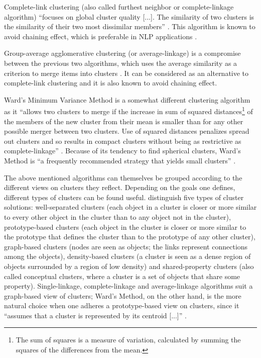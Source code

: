 Complete-link clustering (also called furthest neighbor or complete-linkage algorithm) “focuses on global cluster quality [...]. The similarity of two clusters is the similarity of their two most dissimilar members” \citep[505]{manning_foundations_1999}. This algorithm is known to avoid chaining effect, which is preferable in NLP applications \citep[506]{manning_foundations_1999}.

Group-average agglomerative clustering (or average-linkage) is a compromise between the previous two algorithms, which uses the average similarity as a criterion to merge items into clusters \citep[507]{manning_foundations_1999}. It can be considered as an alternative to complete-link clustering and it is also known to avoid chaining effect.

Ward’s Minimum Variance Method is a somewhat different clustering algorithm as it “allows two clusters to merge if the increase in sum of squared distances\footnote{The sum of squares is a measure of variation, calculated by summing the squares of the differences from the mean.} of the members of the new cluster from their mean is smaller than for any other possible merger between two clusters. Use of squared distances penalizes spread out clusters and so results in compact clusters without being as restrictive as complete-linkage” \citep[426]{glynn_cluster_2014}. Because of its tendency to find spherical clusters, Ward’s Method is “a frequently recommended strategy that yields small clusters” \citep[133]{divjak_structuring_2010}.

The above mentioned algorithms can themselves be grouped according to the different views on clusters they reflect. Depending on the goals one defines, different types of clusters can be found useful. \citet[493--495]{tan_introduction_2006} distinguish five types of cluster solutions: well-separated clusters (each object in a cluster is closer or more similar to every other object in the cluster than to any object not in the cluster), prototype-based clusters (each object in the cluster is closer or more similar to the prototype that defines the cluster than to the prototype of any other cluster), graph-based clusters (nodes are seen as objects; the links represent connections among the objects), density-based clusters (a cluster is seen as a dense region of objects surrounded by a region of low density) and shared-property clusters (also called conceptual clusters, where a cluster is a set of objects that share some property). Single-linkage, complete-linkage and average-linkage algorithms suit a graph-based view of clusters; Ward’s Method, on the other hand, is the more natural choice when one adheres a prototype-based view on clusters, since it “assumes that a cluster is represented by its centroid [...]” \citep[517]{tan_introduction_2006}.

